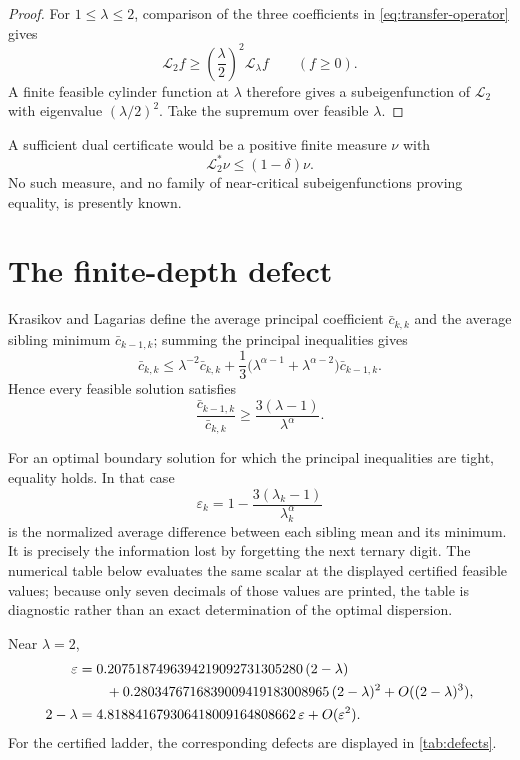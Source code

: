 \documentclass[11pt]{amsart}
\numberwithin{equation}{section}
\newcommand{\eps}{\varepsilon}
\begin{document}
\begin{proof}
For $1\le\lambda\le2$, comparison of the three coefficients in \eqref{eq:transfer-operator} gives
\[
\mathcal L_2 f
\ge\left(\frac\lambda2\right)^2\mathcal L_\lambda f
\qquad(f\ge0).
\]
A finite feasible cylinder function at $\lambda$ therefore gives a subeigenfunction of $\mathcal L_2$ with eigenvalue $(\lambda/2)^2$.  Take the supremum over feasible $\lambda$.
\end{proof}

A sufficient dual certificate would be a positive finite measure $\nu$ with
\[
\mathcal L_2^*\nu\le(1-\delta)\nu.
\]
No such measure, and no family of near-critical subeigenfunctions proving equality, is presently known.

\section{The finite-depth defect}\label{sec:truncation-defect}

Krasikov and Lagarias define the average principal coefficient $\bar c_{k,k}$ and the average sibling minimum $\bar c_{k-1,k}$; summing the principal inequalities gives~\cite[equation following Table~2]{KrasikovLagarias2003}
\begin{equation}\label{eq:average-ineq}
\bar c_{k,k}
\le
\lambda^{-2}\bar c_{k,k}
+
\frac13\bigl(\lambda^{\alpha-1}+\lambda^{\alpha-2}\bigr)
\bar c_{k-1,k}.
\end{equation}
Hence every feasible solution satisfies
\begin{equation}\label{eq:rho-lower}
\frac{\bar c_{k-1,k}}{\bar c_{k,k}}
\ge
\frac{3(\lambda-1)}{\lambda^\alpha}.
\end{equation}

For an optimal boundary solution for which the principal inequalities are tight, equality holds.  In that case
\begin{equation}\label{eq:eps-k}
\eps_k
=1-\frac{3(\lambda_k-1)}{\lambda_k^\alpha}
\end{equation}
is the normalized average difference between each sibling mean and its minimum.  It is precisely the information lost by forgetting the next ternary digit.  The numerical table below evaluates the same scalar at the displayed certified feasible values; because only seven decimals of those values are printed, the table is diagnostic rather than an exact determination of the optimal dispersion.

Near $\lambda=2$,
\begin{align}
\eps
&=0.2075187496394219092731305280\,(2-\lambda)
\notag\\
&\qquad
+0.2803476716839009419183008965\,(2-\lambda)^2
+O((2-\lambda)^3),\label{eq:eps-expansion}\\
2-\lambda
&=4.818841679306418009164808662\,\eps
+O(\eps^2).
\label{eq:lambda-eps-inverse}
\end{align}
For the certified ladder, the corresponding defects are displayed in \cref{tab:defects}.
\end{document}
